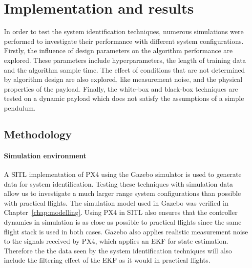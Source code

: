 \section{Implementation and results}

    In order to test the system identification techniques,
    numerous simulations were performed to investigate their performance 
    with different system configurations.
    Firstly, the influence of design parameters on the algorithm performance are explored.
    These parameters include hyperparameters, the length of training data and the algorithm sample time.
    The effect of conditions that are not determined by algorithm design are also explored, 
    like measurement noise, and the physical properties of the payload.
    Finally, the white-box and black-box techniques are tested on a dynamic payload 
    which does not satisfy the assumptions of a simple pendulum.

    \subsection{Methodology}

        \paragraph{Simulation environment}
        A SITL implementation of PX4 \cite{Meier2015} using the Gazebo simulator \cite{Koenig2004} is used to generate data
        for system identification.
        Testing these techniques with simulation data allow us to investigate a much larger range system configurations 
        than possible with practical flights.
        The simulation model used in Gazebo was verified in Chapter~\ref{chap:modelling}.
        Using PX4 in SITL also ensures that the controller dynamics in simulation 
        is as close as possible to practical flights since the same flight stack is used in both cases.
        Gazebo also applies realistic measurement noise to the signals received by PX4, 
        which applies an EKF for state estimation.
        Therefore the the data seen by the system identification techniques 
        will also include the filtering effect of the EKF as it would in practical flights.

